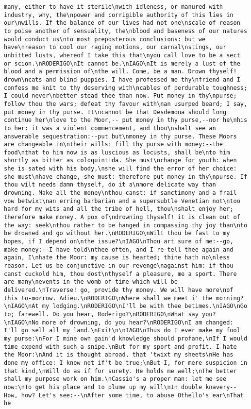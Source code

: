\begin{verbatim}
many, either to have it sterile\nwith idleness, or manured with industry, why, the\npower and corrigible authority of this lies in our\nwills. If the balance of our lives had not one\nscale of reason to poise another of sensuality, the\nblood and baseness of our natures would conduct us\nto most preposterous conclusions: but we have\nreason to cool our raging motions, our carnal\nstings, our unbitted lusts, whereof I take this that\nyou call love to be a sect or scion.\nRODERIGO\nIt cannot be.\nIAGO\nIt is merely a lust of the blood and a permission of\nthe will. Come, be a man. Drown thyself! drown\ncats and blind puppies. I have professed me thy\nfriend and I confess me knit to thy deserving with\ncables of perdurable toughness; I could never\nbetter stead thee than now. Put money in thy\npurse; follow thou the wars; defeat thy favour with\nan usurped beard; I say, put money in thy purse. It\ncannot be that Desdemona should long continue her\nlove to the Moor,-- put money in thy purse,--nor he\nhis to her: it was a violent commencement, and thou\nshalt see an answerable sequestration:--put but\nmoney in thy purse. These Moors are changeable in\ntheir wills: fill thy purse with money:--the food\nthat to him now is as luscious as locusts, shall be\nto him shortly as bitter as coloquintida. She must\nchange for youth: when she is sated with his body,\nshe will find the error of her choice: she must\nhave change, she must: therefore put money in thy\npurse. If thou wilt needs damn thyself, do it a\nmore delicate way than drowning. Make all the money\nthou canst: if sanctimony and a frail vow betwixt\nan erring barbarian and a supersubtle Venetian not\ntoo hard for my wits and all the tribe of hell, thou\nshalt enjoy her; therefore make money. A pox of\ndrowning thyself! it is clean out of the way: seek\nthou rather to be hanged in compassing thy joy than\nto be drowned and go without her.\nRODERIGO\nWilt thou be fast to my hopes, if I depend on\nthe issue?\nIAGO\nThou art sure of me:--go, make money:--I have told\nthee often, and I re-tell thee again and again, I\nhate the Moor: my cause is hearted; thine hath no\nless reason. Let us be conjunctive in our revenge\nagainst him: if thou canst cuckold him, thou dost\nthyself a pleasure, me a sport. There are many\nevents in the womb of time which will be delivered.\nTraverse! go, provide thy money. We will have more\nof this to-morrow. Adieu.\nRODERIGO\nWhere shall we meet i' the morning?\nIAGO\nAt my lodging.\nRODERIGO\nI'll be with thee betimes.\nIAGO\nGo to; farewell. Do you hear, Roderigo?\nRODERIGO\nWhat say you?\nIAGO\nNo more of drowning, do you hear?\nRODERIGO\nI am changed: I'll go sell all my land.\nExit\n\nIAGO\nThus do I ever make my fool my purse:\nFor I mine own gain'd knowledge should profane,\nIf I would time expend with such a snipe.\nBut for my sport and profit. I hate the Moor:\nAnd it is thought abroad, that 'twixt my sheets\nHe has done my office: I know not if't be true;\nBut I, for mere suspicion in that kind,\nWill do as if for surety. He holds me well;\nThe better shall my purpose work on him.\nCassio's a proper man: let me see now:\nTo get his place and to plume up my will\nIn double knavery--How, how? Let's see:--\nAfter some time, to abuse Othello's ear\nThat he 
\end{verbatim}
